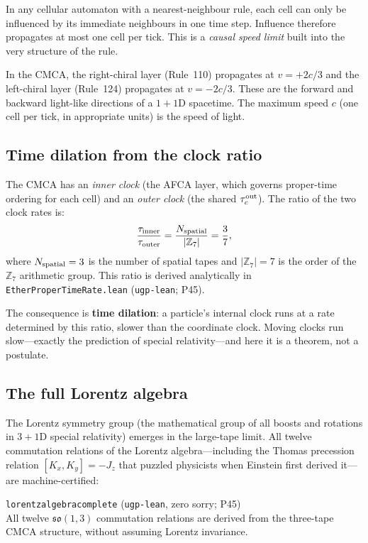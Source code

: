 \documentclass[11pt,a4paper]{article}
\newcommand{\term}[1]{\textbf{#1}}
\newcommand{\lean}[1]{\begingroup\def\_{\textunderscore\allowbreak}\texttt{#1}\endgroup}
\newcommand{\ZS}{\mathbb{Z}_7}
\begin{document}
In any cellular automaton with a nearest-neighbour rule, each cell can only be
influenced by its immediate neighbours in one time step.  Influence therefore
propagates at most one cell per tick.  This is a \emph{causal speed limit}
built into the very structure of the rule.

In the CMCA, the right-chiral layer (Rule~110) propagates at $v = +2c/3$ and
the left-chiral layer (Rule~124) propagates at $v = -2c/3$.
These are the forward and backward light-like directions of a $1{+}1$D spacetime.
The maximum speed $c$ (one cell per tick, in appropriate units) is the speed of light.

\subsection{Time dilation from the clock ratio}

The CMCA has an \emph{inner clock} (the AFCA layer, which governs proper-time
ordering for each cell) and an \emph{outer clock} (the shared $\tau_c^{\rm out}$).
The ratio of the two clock rates is:
\[
  \frac{\tau_{\rm inner}}{\tau_{\rm outer}} = \frac{N_{\rm spatial}}{|\ZS|}
  = \frac{3}{7},
\]
where $N_{\rm spatial} = 3$ is the number of spatial tapes and $|\ZS| = 7$ is the
order of the $\mathbb{Z}_7$ arithmetic group.
This ratio is derived analytically in
\lean{EtherProperTimeRate.lean} (\texttt{ugp-lean}; P45).

The consequence is \term{time dilation}: a particle's internal clock runs at a
rate determined by this ratio, slower than the coordinate clock.
Moving clocks run slow---exactly the prediction of special relativity---and here
it is a theorem, not a postulate.

\subsection{The full Lorentz algebra}

The Lorentz symmetry group (the mathematical group of all boosts and rotations in
$3{+}1$D special relativity) emerges in the large-tape limit.  All twelve
commutation relations of the Lorentz algebra---including the Thomas precession
relation $[K_x, K_y] = -J_z$ that puzzled physicists when Einstein first derived
it---are machine-certified:

\begin{tcolorbox}[colback=boxgreen,colframe=green!50!black]
\lean{lorentz\_algebra\_complete} (\texttt{ugp-lean}, zero sorry; P45)\\
All twelve $\mathfrak{so}(1,3)$ commutation relations are derived from the
three-tape CMCA structure, without assuming Lorentz invariance.
\end{tcolorbox}
\end{document}
